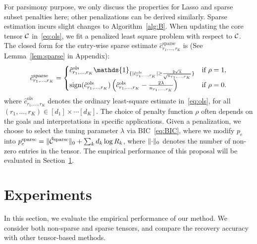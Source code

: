\documentclass{article}
\begin{document}
For parsimony purpose, we only discuss the properties for Lasso and sparse subset penalties here; other penalizations can be derived similarly. Sparse estimation incurs slight changes to Algorithm~\ref{alg:B}. When updating the core tensor $\mathcal{C}$ in~\eqref{eq:ols}, we fit a penalized least square problem with respect to $\mathcal{C}$. 
The closed form for the entry-wise sparse estimate $\hat c^{\text{sparse}}_{r_1,\ldots,r_K}$ is (See Lemma~\ref{lem:sparse} in Appendix):
\begin{equation}\label{eq:lasso}
\hat c^{\text{sparse}}_{r_1,\ldots,r_K}=
\begin{cases}
\hat c^{\text{ols}}_{r_1,\ldots,r_K}\mathds{1}_{\{|\hat c^{\text{ols}}_{r_1,\ldots,r_K} |\geq {2\sqrt{\lambda} \over \sqrt{n_{r_1,\ldots,r_K}}}\}} & \text{if}\ \rho=1,\\
\text{sign}(\hat c^{\text{ols}}_{r_1,\ldots,r_K})\left( \hat c^{\text{ols}}_{r_1,\ldots,r_K}-{2\lambda \over n_{r_1,\ldots,r_K}}  \right) &\text{if}\ \rho=0.
\end{cases}
\end{equation}
where $\hat c^{\text{ols}}_{r_1,\ldots,r_K}$ denotes the ordinary least-square estimate in~\eqref{eq:ols}, for all $(r_1,\ldots,r_K)\in[d_1]\times\cdots[d_K]$. 
The choice of penalty function $\rho$ often depends on the goals and interpretations in specific applications. Given a penalization, we choose to select the tuning parameter $\lambda$ via BIC~\eqref{eq:BIC}, where we modify $p_e$ into $p^{\text{sparse}}_e=\lVert\hat {\mathcal{C}}^{\text{sparse}}\rVert_0+\sum_kd_k\log R_k$, where $\lVert\cdot\rVert_0$ denotes the number of non-zero entries in the tensor. The empirical performance of this proposal will be evaluated in Section~\ref{sec:simulation}. 



\section{Experiments}\label{sec:simulation}
In this section, we evaluate the empirical performance of our method. We consider both non-sparse and sparse tensors, and compare the recovery accuracy with other tensor-based methods. 
\end{document}
